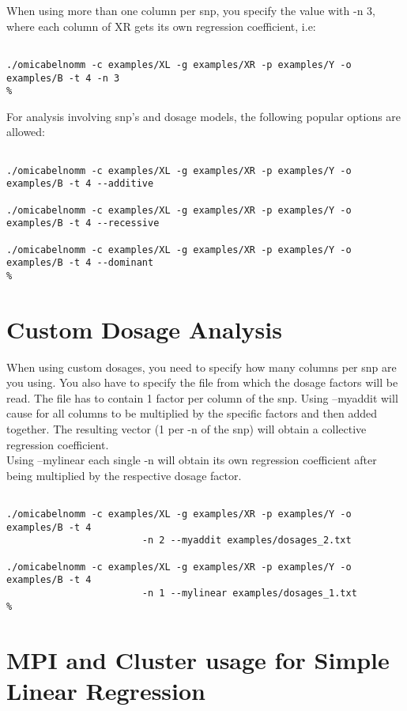 \documentclass{report}
\begin{document}
When using more than one column per snp, you specify the value with -n 3, where each column of XR gets its own regression coefficient, i.e: 

\begin{lstlisting}[style=BASH,escapechar=\%]

./omicabelnomm -c examples/XL -g examples/XR -p examples/Y -o examples/B -t 4 -n 3
%
\end{lstlisting}

For analysis involving snp's and dosage models, the following popular options are allowed:

\begin{lstlisting}[style=BASH,escapechar=\%]

./omicabelnomm -c examples/XL -g examples/XR -p examples/Y -o examples/B -t 4 --additive

./omicabelnomm -c examples/XL -g examples/XR -p examples/Y -o examples/B -t 4 --recessive

./omicabelnomm -c examples/XL -g examples/XR -p examples/Y -o examples/B -t 4 --dominant
%
\end{lstlisting}

\section{Custom Dosage Analysis}

When using custom dosages, you need to specify how many columns per snp are you using. You also have to specify the file from which the dosage factors will be read. The file has to contain 1 factor per column of the snp. 
Using --myaddit will cause for all columns to be multiplied by the specific factors and then added together. The resulting vector (1 per -n  of the snp) will obtain a collective regression coefficient.\\
Using --mylinear each single -n will obtain its own regression coefficient after being multiplied by the respective dosage factor.

\begin{lstlisting}[style=BASH,escapechar=\%]

./omicabelnomm -c examples/XL -g examples/XR -p examples/Y -o examples/B -t 4 
						-n 2 --myaddit examples/dosages_2.txt

./omicabelnomm -c examples/XL -g examples/XR -p examples/Y -o examples/B -t 4
						-n 1 --mylinear examples/dosages_1.txt
%
\end{lstlisting}


\section{MPI and Cluster usage for Simple Linear Regression}
\end{document}
